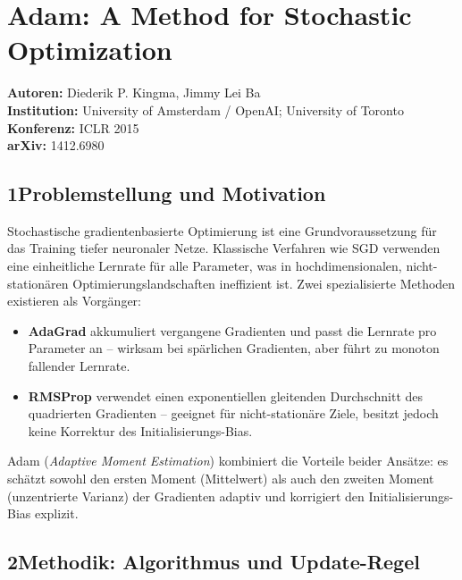 \documentclass[a4paper,12pt]{article}
\begin{document}
\section*{Adam: A Method for Stochastic Optimization}

\textbf{Autoren:} Diederik P. Kingma, Jimmy Lei Ba \\
\textbf{Institution:} University of Amsterdam / OpenAI; University of Toronto \\
\textbf{Konferenz:} ICLR 2015 \\
\textbf{arXiv:} 1412.6980

\subsection*{1\quad Problemstellung und Motivation}

Stochastische gradientenbasierte Optimierung ist eine Grundvoraussetzung für das Training tiefer
neuronaler Netze. Klassische Verfahren wie SGD verwenden eine einheitliche Lernrate für alle
Parameter, was in hochdimensionalen, nicht-stationären Optimierungslandschaften ineffizient ist.
Zwei spezialisierte Methoden existieren als Vorgänger:
\begin{itemize}
    \item \textbf{AdaGrad} akkumuliert vergangene Gradienten und passt die Lernrate pro Parameter
    an -- wirksam bei spärlichen Gradienten, aber führt zu monoton fallender Lernrate.
    \item \textbf{RMSProp} verwendet einen exponentiellen gleitenden Durchschnitt des quadrierten
    Gradienten -- geeignet für nicht-stationäre Ziele, besitzt jedoch keine Korrektur des
    Initialisierungs-Bias.
\end{itemize}

Adam (\emph{Adaptive Moment Estimation}) kombiniert die Vorteile beider Ansätze: es schätzt
sowohl den ersten Moment (Mittelwert) als auch den zweiten Moment (unzentrierte Varianz) der
Gradienten adaptiv und korrigiert den Initialisierungs-Bias explizit.

\subsection*{2\quad Methodik: Algorithmus und Update-Regel}
\end{document}
